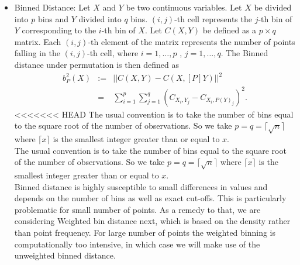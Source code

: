 \documentclass[12]{report}
\begin{document}
\begin{itemize}
\item Binned Distance:
Let $X$ and $Y$ be two continuous variables. Let $X$ be divided into $p$ bins and $Y$ divided into $q$ bins. $(i,j)$-th cell represents the $j$-th bin of $Y$ corresponding to the $i$-th bin of $X$. Let $C(X,Y)$ be defined as a $p \times q$ matrix. Each $(i,j)$-th element of the matrix represents the number of points falling in the $(i,j)$-th cell, where $i = 1, \dots, p$ , $j = 1, \dots, q$.
The Binned distance under permutation is then defined as
\begin{eqnarray*}
b^2_P(X) &:=& ||C(X,Y) - C(X,[P]Y)||^2 \\ &=& \sum_{i=1}^p \sum_{j=1}^q (C_{X_i,Y_j} - C_{X_i,P(Y)_j})^2.
\end{eqnarray*}
<<<<<<< HEAD
The usual convention is to take the number of bins equal to the square root of the number of observations. So we take $p = q = \lceil{\sqrt{n}} \rceil$ where $\lceil{x} \rceil$ is the smallest integer greater than or equal to $x$. \\

The usual convention is to take the number of bins equal to the square root of the number of observations. So we take $p = q = \lceil {\sqrt{n}}\rceil$ where $\lceil {x}\rceil$ is the smallest integer greater than or equal to $x$. \\

Binned distance is highly susceptible to small differences in values and depends on the number of bins as well as exact cut-offs. This is particularly problematic for small number of points. As a remedy to that, we are considering Weighted bin distance next, which is based on the density rather than point frequency. For large number of points the weighted binning is computationally too intensive, in which case we will make use of the unweighted  binned distance.



\end{itemize}
\end{document}
